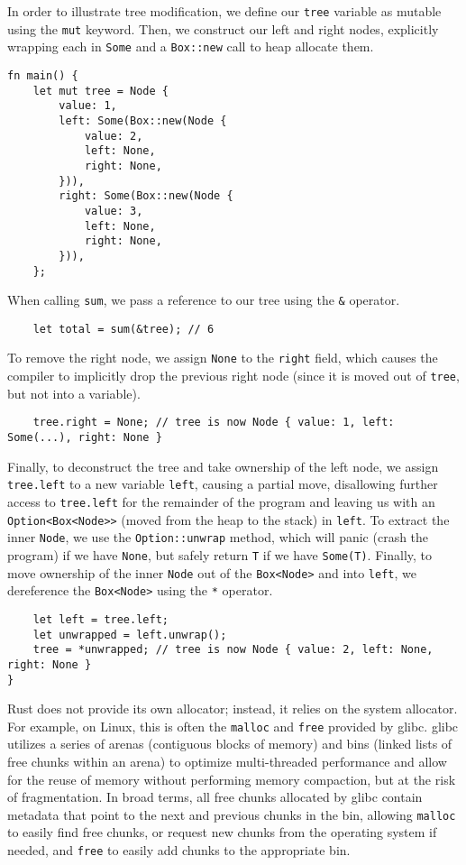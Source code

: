 \documentclass[12pt, letterpaper]{article}
\begin{document}
In order to illustrate tree modification, we define our \texttt{tree} variable as mutable using the \texttt{mut} keyword. Then, we construct our left and right nodes, explicitly wrapping each in \texttt{Some} and a \texttt{Box::new} call to heap allocate them.
\begin{verbatim}
fn main() {
    let mut tree = Node {
        value: 1,
        left: Some(Box::new(Node {
            value: 2,
            left: None,
            right: None,
        })),
        right: Some(Box::new(Node {
            value: 3,
            left: None,
            right: None,
        })),
    };
\end{verbatim}
When calling \texttt{sum}, we pass a reference to our tree using the \texttt{\&} operator.
\begin{verbatim}
    let total = sum(&tree); // 6
\end{verbatim}
To remove the right node, we assign \texttt{None} to the \texttt{right} field, which causes the compiler to implicitly drop the previous right node (since it is moved out of \texttt{tree}, but not into a variable).\autocite[\S 15.2.2]{rust-example}
\begin{verbatim}
    tree.right = None; // tree is now Node { value: 1, left: Some(...), right: None }
\end{verbatim}
Finally, to deconstruct the tree and take ownership of the left node, we assign \texttt{tree.left} to a new variable \texttt{left}, causing a partial move, disallowing further access to \texttt{tree.left} for the remainder of the program and leaving us with an \texttt{Option<Box<Node>>} (moved from the heap to the stack) in \texttt{left}. To extract the inner \texttt{Node}, we use the \texttt{Option::unwrap} method, which will panic (crash the program) if we have \texttt{None}, but safely return \texttt{T} if we have \texttt{Some(T)}.\autocite{rust-option} Finally, to move ownership of the inner \texttt{Node} out of the \texttt{Box<Node>} and into \texttt{left}, we dereference the \texttt{Box<Node>} using the \texttt{*} operator.\autocite{rust-boxed}
\begin{verbatim}
    let left = tree.left;
    let unwrapped = left.unwrap();
    tree = *unwrapped; // tree is now Node { value: 2, left: None, right: None }
}
\end{verbatim}

Rust does not provide its own allocator; instead, it relies on the system allocator. For example, on Linux, this is often the \texttt{malloc} and \texttt{free} provided by glibc. glibc utilizes a series of arenas (contiguous blocks of memory) and bins (linked lists of free chunks within an arena) to optimize multi-threaded performance and allow for the reuse of memory without performing memory compaction, but at the risk of fragmentation. In broad terms, all free chunks allocated by glibc contain metadata that point to the next and previous chunks in the bin, allowing \texttt{malloc} to easily find free chunks, or request new chunks from the operating system if needed, and \texttt{free} to easily add chunks to the appropriate bin.\autocite{glibc}
\end{document}
